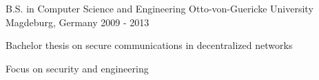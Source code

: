 


\begin{cventries}


\cventry
{B.S. in Computer Science and Engineering} %
{Otto-von-Guericke University} %
{Magdeburg, Germany} %
{2009 - 2013} %
{ %
\begin{cvitems}
\item {Bachelor thesis on secure communications in decentralized networks}
\item {Focus on security and engineering}
\end{cvitems}
}


\end{cventries}